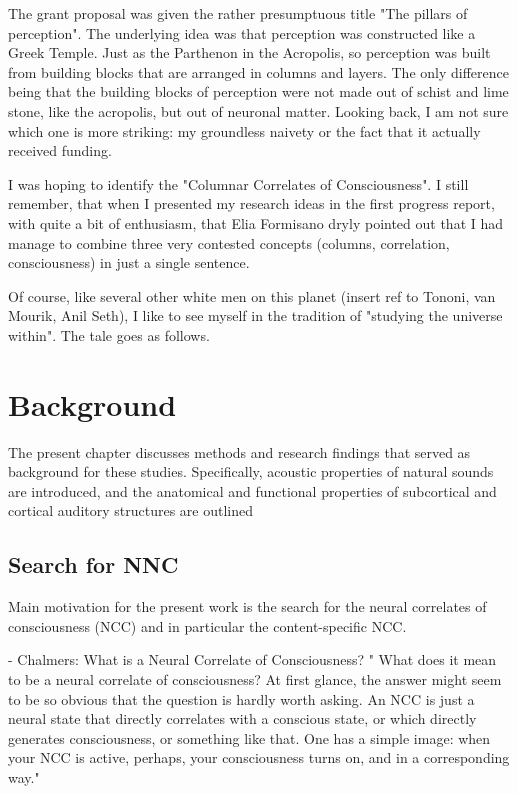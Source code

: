 The grant proposal was given the rather presumptuous title "The pillars of perception". The underlying idea was that perception was constructed like a Greek Temple. Just as the Parthenon in the Acropolis, so perception was built from building blocks that are arranged in columns and layers. The only difference being that the 
building blocks of perception were not made out of schist and lime stone, like the acropolis, but out of neuronal matter. Looking back, I am not sure which one is more striking: my groundless naivety or the fact that it actually received funding.

I was hoping to identify the "Columnar Correlates of Consciousness". I still remember, that when I presented my research ideas in the first progress report, with quite a bit of enthusiasm, that Elia Formisano dryly pointed out that I had manage to combine three very contested concepts (columns, correlation, consciousness) in just a single sentence.

Of course, like several other white men on this planet (insert ref to Tononi, van Mourik, Anil Seth), I like to see myself in the tradition of "studying the universe within". The tale goes as follows.

\section{Background}
The present chapter discusses methods and research findings that served as background for these studies. Specifically, acoustic properties of natural sounds are introduced, and the anatomical and functional properties of subcortical and cortical auditory structures are outlined

\subsection{Search for NNC}
Main motivation for the present work is the search for the neural correlates of consciousness (NCC) and in particular the content-specific NCC.

- Chalmers: What is a Neural Correlate of Consciousness?
" What does it mean to be a neural correlate of consciousness? At first glance, the answer might seem to be so obvious that the question is hardly worth asking. An NCC is just a neural state that directly correlates with a conscious state, or which directly generates consciousness, or something like that. One has a simple image: when your NCC is active, perhaps, your consciousness turns on, and in a corresponding way."

